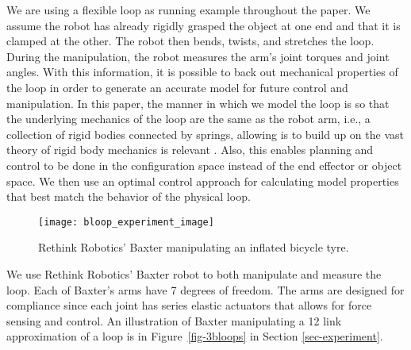 \documentclass[letterpaper, 10pt, conference]{ieeeconf}
\begin{document}
We are using a flexible loop as running example throughout the paper.  We assume the robot has already rigidly grasped the object at one end and that it is clamped at the other.  The robot then bends, twists, and stretches the loop.  During the manipulation, the robot measures the arm's joint torques and joint angles.  With this information, it is possible to back out mechanical properties of the loop in order to generate an accurate model for future control and manipulation.  In this paper, the manner in which we model the loop is so that the underlying mechanics of the loop are the same as the robot arm, i.e., a collection of rigid bodies connected by springs, allowing is to build up on 
the vast theory of rigid body mechanics is relevant \cite{murray_li_sastry}. Also,  this enables planning and control to be done in the configuration space instead of the end effector or object space.  We then use an optimal control approach for calculating model properties that best match the behavior of the physical loop.



\begin{figure}
\centering
\texttt{[image: bloop\_experiment\_image]}
\caption{Rethink Robotics' Baxter manipulating an inflated bicycle tyre.}
\label{fig-baxter_image_1}
\end{figure}

We use Rethink Robotics' Baxter \cite{guizzo2011rethink} robot to both manipulate and measure the loop.  Each of Baxter's arms have 7 degrees of freedom.  The arms are designed for compliance since each joint has series elastic actuators that allows for force sensing and control.  An illustration of Baxter manipulating a 12 link approximation of a loop is in Figure~\ref{fig-3bloops} in Section \ref{sec-experiment}.
\end{document}
